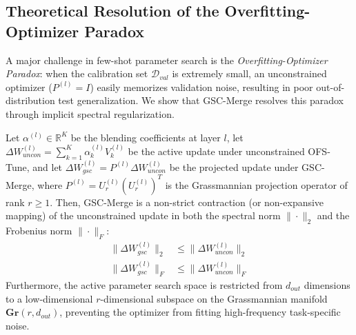 \subsection{Theoretical Resolution of the Overfitting-Optimizer Paradox}
\label{subsec:overfitting_paradox}

A major challenge in few-shot parameter search is the \emph{Overfitting-Optimizer Paradox}: when the calibration set $\mathcal{D}_{val}$ is extremely small, an unconstrained optimizer ($P^{(l)} = I$) easily memorizes validation noise, resulting in poor out-of-distribution test generalization. We show that GSC-Merge resolves this paradox through implicit spectral regularization.

\begin{proposition}
Let $\alpha^{(l)} \in \mathbb{R}^K$ be the blending coefficients at layer $l$, let $\Delta W_{uncon}^{(l)} = \sum_{k=1}^K \alpha_k^{(l)} V_k^{(l)}$ be the active update under unconstrained OFS-Tune, and let $\Delta W_{gsc}^{(l)} = P^{(l)} \Delta W_{uncon}^{(l)}$ be the projected update under GSC-Merge, where $P^{(l)} = U_r^{(l)} (U_r^{(l)})^T$ is the Grassmannian projection operator of rank $r \ge 1$. Then, GSC-Merge is a non-strict contraction (or non-expansive mapping) of the unconstrained update in both the spectral norm $\|\cdot\|_2$ and the Frobenius norm $\|\cdot\|_F$:
\begin{align}
    \|\Delta W_{gsc}^{(l)}\|_2 &\le \|\Delta W_{uncon}^{(l)}\|_2 \\
    \|\Delta W_{gsc}^{(l)}\|_F &\le \|\Delta W_{uncon}^{(l)}\|_F
\end{align}
Furthermore, the active parameter search space is restricted from $d_{out}$ dimensions to a low-dimensional $r$-dimensional subspace on the Grassmannian manifold $\mathbf{Gr}(r, d_{out})$, preventing the optimizer from fitting high-frequency task-specific noise.
\end{proposition}

